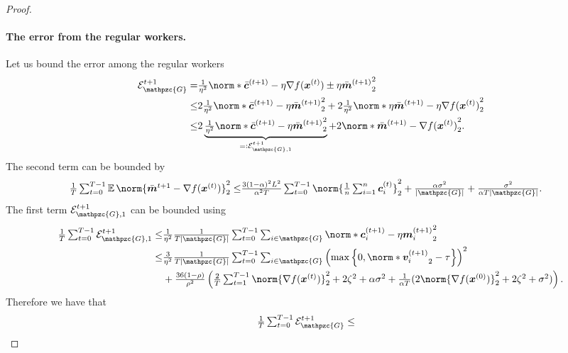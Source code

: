 \documentclass{article}
\newcommand{\gset}{\ensuremath{{\mathpzc{G}}}}
\begin{document}
\begin{proof}
  \paragraph*{The error from the regular workers.}
  Let us bound the error among the regular workers
  \begin{align*}
    \cE_{\gset}^{t+1} = & \tfrac{1}{\eta^2}
    \norm*{ \bar{\cc}^{(t+1)}  - \eta \nabla f(\xx^{(t)}) \pm \eta \bar{\mm}^{(t+1)}  }_2^2 \\
    \le                 & 2 \tfrac{1}{\eta^2}
    \norm*{ \bar{\cc}^{(t+1)}  - \eta \bar{\mm}^{(t+1)}  }_2^2
    + 2 \tfrac{1}{\eta^2}
    \norm*{ \eta \bar{\mm}^{(t+1)}   - \eta \nabla f(\xx^{(t)}) }_2^2                       \\
    \le                 & 2 \underbrace{\tfrac{1}{\eta^2}
      \norm*{ \bar{\cc}^{(t+1)}  - \eta \bar{\mm}^{(t+1)}  }_2^2 }_{=: \cE^{t+1}_{\gset,1} }
    + 2
    \norm*{ \bar{\mm}^{(t+1)}   -  \nabla f(\xx^{(t)}) }_2^2.
  \end{align*}
  The second term can be bounded by 
  \begin{align*}
    \tfrac{1}{T} \tsum_{t=0}^{T-1}
    \E\norm{\bar{\mm}^{t+1} - \nabla f(\xx^{(t)}) }_2^2
    \le & \tfrac{3(1-\alpha)^2L^2}{\alpha^2T} \tsum_{t=0}^{T-1}
    \norm{ \tfrac{1}{n} \tsum_{i=1}^n \cc_i^{(t)} }_2^2
    + \tfrac{\alpha\sigma^2}{|\gset|} + \tfrac{\sigma^2}{ \alpha  T|\gset|}.
  \end{align*}
  The first term $\cE^{t+1}_{\gset,1}$ can be bounded using 
  \begin{align*}
    \tfrac{1}{T} \tsum_{t=0}^{T-1} \cE^{t+1}_{\gset,1}
    \le & \tfrac{1}{\eta^2} \tfrac{1}{T|\gset|} \tsum_{t=0}^{T-1} \tsum_{i\in\gset}
    \norm*{ \cc_i^{(t+1)}  - \eta \mm_i^{(t+1)}  }_2^2                                                                                       \\
    \le &
    \tfrac{3}{\eta^2}\tfrac{1}{T|\gset|}\tsum_{t=0}^{T-1}\tsum_{i\in\gset} \left(\max\left\{0, \norm*{\vv_i^{(t+1)}}_2-\tau\right\}\right)^2 \\
        & +
    \tfrac{36(1-\rho)}{\rho^2} \left(\tfrac{2}{T}\tsum_{t=1}^{T-1} \norm{\nabla f(\xx^{(t)}) }_2^2
    +  2  \zeta^2
    + \alpha\sigma^2
    + \tfrac{1}{\alpha T}(2\norm{\nabla f(\xx^{(0)}) }_2^2
      + 2 \zeta^2
      + \sigma^2) \right).
  \end{align*}
  Therefore we have that
  \begin{align*}
    \tfrac{1}{T} \tsum_{t=0}^{T-1} \cE^{t+1}_{\gset}
    \le &

\end{align*}
\end{proof}
\end{document}
